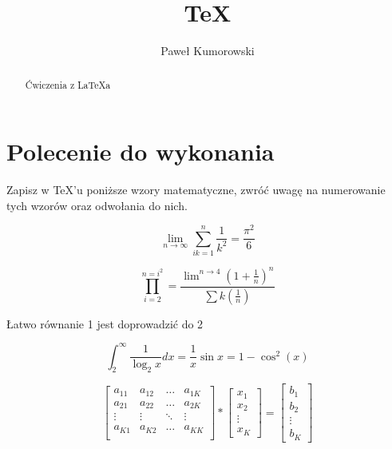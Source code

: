 \documentclass[a4paper,12pt]{article}
\title{\TeX}
\author{Paweł Kumorowski}
\begin{document}
\maketitle

\begin{abstract}
Ćwiczenia z La\TeX a
\end{abstract}

\section{Polecenie do wykonania}
Zapisz w TeX'u poniższe wzory matematyczne, zwróć uwagę na numerowanie tych wzorów oraz odwołania do nich.

\begin{equation}
\lim\limits_{n \to \infty} \sum_{ik=1}^n \frac{1}{k^{2}} = \frac{\pi^{2}}{6}
\label{eq:rownanie}
\end{equation}

\begin{equation}
\prod_{i=2}^{n=i^2}=\frac{\lim\nolimits^{n \to 4}(1+\frac{1}{n})^n}{\sum k(\frac{1}{n})}
\label{eq:rownanie}
\end{equation}

Łatwo równanie 1 jest doprowadzić do 2

\begin{equation}
\int_2^\infty\frac{1}{\log_2x}dx=\frac{1}{x}\sin x=1-\cos^2(x)
\label{eq:rownanie}
\end{equation}

\begin{equation}
\left[\begin{array}{cccc}
a_{11} & a_{12} & \ldots & a_{1K}\\
a_{21} & a_{22} & \ldots & a_{2K}\\
\vdots & \vdots & \ddots &\vdots \\
a_{K1} & a_{K2} & \ldots & a_{KK}\\
\end{array}\right]
*
\left[\begin{array}{c}
x_1 \\
x_2 \\
\vdots \\
x_K
\end{array} \right]
=
\left[\begin{array}{c}
b_1 \\
b_2 \\
\vdots \\
b_K
\end{array}\right]
\label{eq:rownanie}
\end{equation}
\end{document}
